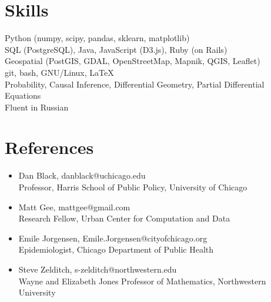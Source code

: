 \documentclass[margin,line]{resume}
\begin{document}
\begin{resume}
    \section{\mysidestyle Skills}
		Python (numpy, scipy, pandas, sklearn, matplotlib) \\
                SQL (PostgreSQL), Java, JavaScript (D3.js), Ruby (on Rails)\\
                Geospatial (PostGIS, GDAL, OpenStreetMap, Mapnik, QGIS, Leaflet)\\
                git, bash, GNU/Linux, \LaTeX\\
		Probability, Causal Inference, Differential Geometry, Partial Differential Equations\\
                Fluent in Russian
	\section{\mysidestyle References}
		\begin{itemize}

        \item Dan Black, danblack@uchicago.edu \\
                Professor, Harris School of Public Policy, University of Chicago
	\item Matt Gee, mattgee@gmail.com \\
		Research Fellow, Urban Center for Computation and Data 
	\item Emile Jorgensen, Emile.Jorgensen@cityofchicago.org \\
		Epidemiologist, Chicago Department of Public Health
	\item Steve Zelditch, s-zelditch@northwestern.edu \\
		Wayne and Elizabeth Jones Professor of Mathematics, Northwestern University 
		\end{itemize}
\end{resume}
\end{document}
